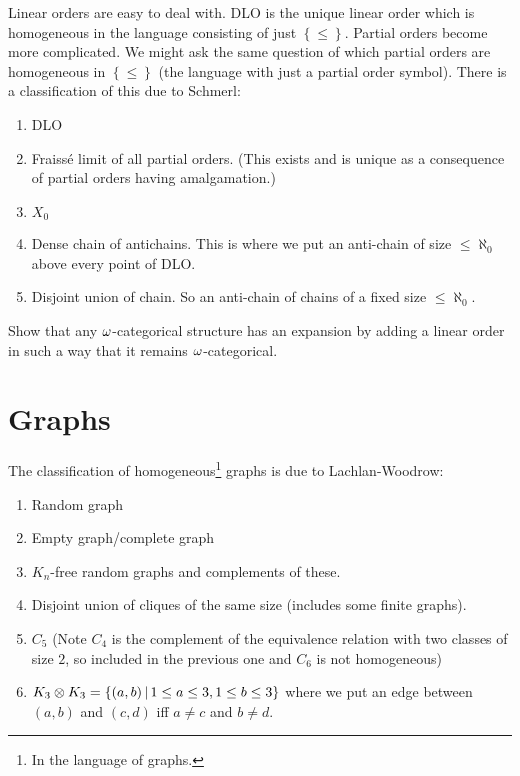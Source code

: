 \documentclass{amsart}
\begin{document}
Linear orders are easy to deal with. 
DLO is the unique linear order which is homogeneous in the language
consisting of just $\left\{ \leq \right\}$.
Partial orders become more complicated. 
We might ask the same question of which partial orders are homogeneous in $\left\{ \leq\right\}$ 
(the language with just a partial order symbol).
There is a classification of this due to Schmerl:
\begin{enumerate}
\item DLO
\item Fraiss\'e limit of all partial orders. (This exists and is unique as a consequence of partial
orders having amalgamation.)
\item $X_0$
\item Dense chain of antichains. This is where we put an anti-chain of size $\leq
\aleph_0$ above every point of DLO. 
\item Disjoint union of chain. So an anti-chain of chains of a fixed size $\leq \aleph_0$.
\end{enumerate}

\begin{exr}[*]
Show that any $\omega$-categorical structure has an expansion by adding 
a linear order in such a way that it remains $\omega$-categorical.
\end{exr}

\section{Graphs}

The classification of homogeneous\footnote{In the language of graphs.} graphs is due to
Lachlan-Woodrow:
\begin{enumerate}
\item Random graph
\item Empty graph/complete graph
\item $K_n$-free random graphs and complements of these.
\item Disjoint union of cliques of the same size
(includes some finite graphs).
\item $C_5$ (Note $C_4$ is the complement of the equivalence relation with two classes of size $2$, 
so included in the previous one and $C_6$ is not homogeneous)
\item $K_3\otimes K_3 = 
\left\{ \left( a,b \right) \, \middle\vert \, 1\leq a\leq 3, 1\leq b \leq 3 \right\}$ where we put an
edge between $\left( a,b \right)$ and $\left( c,d \right)$ iff $a\neq c$ and $b\neq d$.
\end{enumerate}
\end{document}

